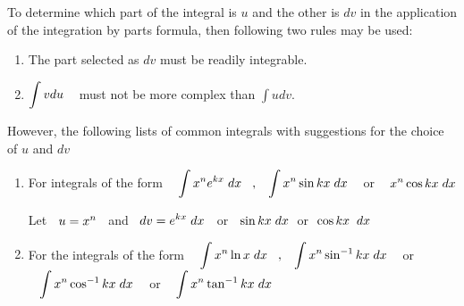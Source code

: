 \documentclass[11pt,a4paper]{article}
\theoremstyle{definition}
\begin{document}
To determine which part of the integral is $u$ and the other is $dv$ in the application of the integration by parts formula, then following two rules may be used:
\begin{enumerate}
\item The part selected as $dv$ must be readily integrable.

\item $\displaystyle{\int v du}\hspace{0.3cm}$ must not be more complex than $\displaystyle{\int u dv}$.
\end{enumerate}

However, the following lists of common integrals with suggestions for the choice of $u$ and $dv$
\begin{enumerate}
\item For integrals of the form $\hspace{0.3cm}\displaystyle{\int x^n e^{kx}\hspace{0.1cm}dx\hspace{0.3cm}, \hspace{0.3cm} \int x^n \sin kx \hspace{0.1cm}dx}\hspace{0.3cm}$ or $\hspace{0.3cm} \displaystyle{x^n\cos kx \hspace{0.1cm}dx}$

Let $\hspace{0.2cm} u = x^n\hspace{0.2cm}$ and $\hspace{0.2cm}\displaystyle{ dv = e^{kx}\hspace{0.1cm}dx}\hspace{0.2cm}$ or $\hspace{0.2cm} \sin kx\hspace{0.1cm}dx\hspace{0.1cm}$ or $\hspace{0.1cm} \cos kx\hspace{0.2cm}dx$

\item  For the integrals of the form $\hspace{0.3cm}\displaystyle{\int x^n\ln x\hspace{0.1cm}dx\hspace{0.3cm} , \hspace{0.3cm} \int x^n\sin^{-1}kx\hspace{0.1cm}dx\hspace{0.3cm}}$ or $\hspace{0.3cm}\displaystyle{\int x^n \cos^{-1}kx\hspace{0.1cm}dx}\hspace{0.3cm}$ or $\hspace{0.3cm}\displaystyle{\int x^n \tan^{-1}kx\hspace{0.1cm}dx}$


\end{enumerate}
\end{document}

